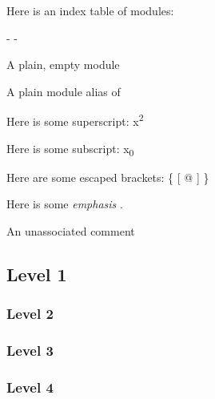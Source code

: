 Here is an index table of  modules:

\begin{description}\kern-\topsep
\makeatletter\advance\@topsepadd-\topsep\makeatother%
\item[{\hyperref[module-Ocamlary-module-Empty]{\ocamlinlinecode{\ocamlinlinecode{Empty}}[p\pageref*{module-Ocamlary-module-Empty}]}}]{A plain, empty module}%
\item[{\hyperref[module-Ocamlary-module-Empty]{\ocamlinlinecode{\ocamlinlinecode{EmptyAlias}}[p\pageref*{module-Ocamlary-module-Empty}]}}]{A plain module alias of }\end{description}%
Here is some superscript: x\textsuperscript{2}

Here is some subscript: x\textsubscript{0}

Here are some escaped brackets: \{ [ @ ] \}

Here is some \emph{emphasis} .

An unassociated comment

\subsection{Level 1\label{level-1}}%
\subsubsection{Level 2\label{level-2}}%
\subsubsection{Level 3\label{level-3}}%
\subsubsection{Level 4\label{level-4}}%
